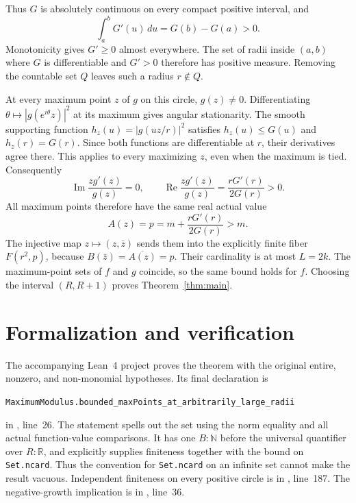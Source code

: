\documentclass[11pt]{article}
\numberwithin{equation}{section}
\newcommand{\N}{\mathbb N}
\newcommand{\R}{\mathbb R}
\begin{document}
Thus $G$ is absolutely continuous on every compact positive interval,
and
\[
 \int_a^bG'(u)\,du=G(b)-G(a)>0.
\]
Monotonicity gives $G'\ge0$ almost everywhere. The set of radii inside
$(a,b)$ where $G$ is differentiable and $G'>0$ therefore has positive
measure. Removing the countable set $Q$ leaves such a radius $r\notin Q$.

At every maximum point $z$ of $g$ on this circle, $g(z)\ne0$.
Differentiating $\theta\mapsto |g(e^{i\theta}z)|^2$ at its maximum gives
angular stationarity. The smooth supporting function
$h_z(u)=|g(uz/r)|^2$ satisfies $h_z(u)\le G(u)$ and $h_z(r)=G(r)$.
Since both functions are differentiable at $r$, their derivatives agree
there. This applies to every maximizing $z$, even when the maximum is tied.
Consequently
\[
 \operatorname{Im}\frac{zg'(z)}{g(z)}=0,\qquad
 \operatorname{Re}\frac{zg'(z)}{g(z)}=\frac{rG'(r)}{2G(r)}>0.
\]
All maximum points therefore have the same real actual value
\[
 A(z)=p=m+\frac{rG'(r)}{2G(r)}>m.
\]
The injective map $z\mapsto(z,\bar z)$ sends them into the explicitly
finite fiber $F(r^2,p)$, because
$B(\bar z)=\overline{A(z)}=p$.
Their cardinality is at most $L=2k$.
The maximum-point sets of $f$ and $g$ coincide, so the same bound holds
for $f$. Choosing the interval $(R,R+1)$ proves Theorem~\ref{thm:main}.

\section{Formalization and verification}\label{sec:lean}

The accompanying Lean~4 project proves the theorem with the original
entire, nonzero, and non-monomial hypotheses. Its final declaration is
\begin{center}
\small\nolinkurl{MaximumModulus.bounded_maxPoints_at_arbitrarily_large_radii}
\end{center}
in , line~26. The statement spells out
the set using the norm equality and all actual function-value comparisons.
It has one $B:\N$ before the universal quantifier over $R:\R$, and
explicitly supplies finiteness together with the bound on
\texttt{Set.ncard}. Thus the convention for \texttt{Set.ncard} on an
infinite set cannot make the result vacuous. Independent finiteness on
every positive circle is in ,
line~187. The negative-growth implication is in
, line~36.
\end{document}

